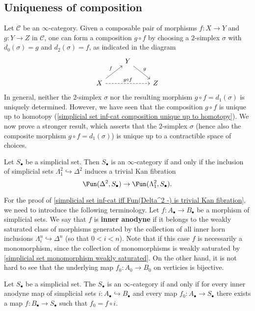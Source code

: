 \subsection{Uniqueness of composition}
Let $\mathcal{C}$ be an $\infty$-category. Given a composable pair of morphisms $f:X\to Y$ and $g:Y\to Z$ in $\mathcal{C}$, one can form a composition $g\circ f$ by choosing a $2$-simplex $\sigma$ with $d_0(\sigma)=g$ and $d_2(\sigma)=f$, as indicated in the diagram
\[\begin{tikzcd}
&Y\ar[rd,"g"]&\\
X\ar[ru,"f"]\ar[rr,dashed,"g\circ f"]&&Z
\end{tikzcd}\]
In general, neither the $2$-simplex $\sigma$ nor the resulting morphism $g\circ f=d_1(\sigma)$ is uniquely determined. However, we have seen that the composition $g\circ f$ is unique up to homotopy (\cref{simplicial set inf-cat composition unique up to homotopy}). We now prove a stronger result, which asserts that the $2$-simplex $\sigma$ (hence also the composite morphism $g\circ f=d_1(\sigma)$) is unique up to a contractible space of choices.
\begin{theorem}\label{simplicial set inf-cat iff Fun(Delta^2 -) is trivial Kan fibration}
Let $S_\bullet$ be a simplicial set. Then $S_\bullet$ is an $\infty$-category if and only if the inclusion of simplicial sets $\Lambda^2_1\hookrightarrow\Delta^2$ induces a trivial Kan fibration
\[\Fun(\Delta^2,S_\bullet)\to\Fun(\Lambda^2_1,S_\bullet).\]
\end{theorem}
For the proof of \cref{simplicial set inf-cat iff Fun(Delta^2 -) is trivial Kan fibration}, we need to introduce the following terminology. Let $f:A_\bullet\to B_\bullet$ be a morphism of simplicial sets. We say that $f$ is \textbf{inner anodyne} if it belongs to the weakly saturated class of morphisms generated by the collection of all inner horn inclusions $\Lambda^n_i\hookrightarrow\Delta^n$ (so that $0<i<n$). Note that if this case $f$ is necessarily a monomorphism, since the collection of monomorphisms is weakly saturated by \cref{simplicial set monomorphism weakly saturated}. On the other hand, it is not hard to see that the underlying map $f_0:A_0\to B_0$ on verticies is bijective.
\begin{proposition}\label{simplicial set inf-cat iff lifting for inner anodyne}
Let $S_\bullet$ be a simplicial set. The $S_\bullet$ is an $\infty$-category if and only if for every inner anodyne map of simplicial sets $i:A_\bullet\hookrightarrow B_\bullet$ and every map $f_0:A_\bullet\to S_\bullet$ there exists a map $f:B_\bullet\to S_\bullet$ such that $f_0=f\circ i$.
\end{proposition}
